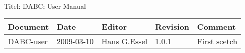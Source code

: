 \\Titel: DABC: User Manual
\begin{table}[h]
\begin{tabular}{|p{2.0cm}|p{1.9cm}|p{3.2cm}|p{1.5cm}|p{5.8cm}|} \hline
Document   & Date        & Editor       & Revision & Comment \\
\hline DABC-user & 2009-03-10 & Hans G.Essel & 1.0.1      &
First scetch \\ \hline
\end{tabular}
\end{table}
